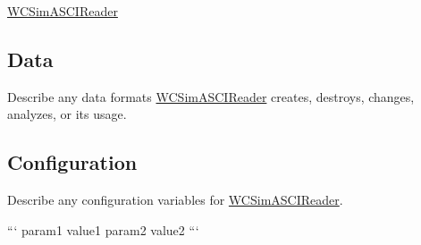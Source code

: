 \hyperlink{classWCSimASCIReader}{W\-C\-Sim\-A\-S\-C\-I\-Reader}

\subsection*{Data}

Describe any data formats \hyperlink{classWCSimASCIReader}{W\-C\-Sim\-A\-S\-C\-I\-Reader} creates, destroys, changes, analyzes, or its usage.

\subsection*{Configuration}

Describe any configuration variables for \hyperlink{classWCSimASCIReader}{W\-C\-Sim\-A\-S\-C\-I\-Reader}.

``` param1 value1 param2 value2 ``` 